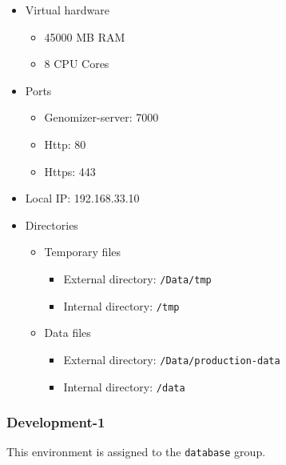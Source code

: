 \begin{itemize}
\itemsep1pt\parskip0pt
\item
  Virtual hardware

  \begin{itemize}
  \itemsep1pt\parskip0pt
  \item
    45000 MB RAM
  \item
    8 CPU Cores
  \end{itemize}
\item
  Ports

  \begin{itemize}
  \itemsep1pt\parskip0pt
  \item
    Genomizer-server: 7000
  \item
    Http: 80
  \item
    Https: 443
  \end{itemize}
\item
  Local IP: 192.168.33.10
\item
  Directories

  \begin{itemize}
  \itemsep1pt\parskip0pt
  \item
    Temporary files

    \begin{itemize}
    \itemsep1pt\parskip0pt
    \item
      External directory: \texttt{/Data/tmp}
    \item
      Internal directory: \texttt{/tmp}
    \end{itemize}
  \item
    Data files

    \begin{itemize}
    \itemsep1pt\parskip0pt
    \item
      External directory: \texttt{/Data/production-data}
    \item
      Internal directory: \texttt{/data}
    \end{itemize}
  \end{itemize}
\end{itemize}

\subsubsection{Development-1}\label{development-1}

This environment is assigned to the \texttt{database} group.

